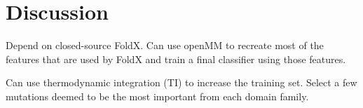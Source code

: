 \documentclass[11pt]{article}
\begin{document}
\section{Discussion}

Depend on closed-source FoldX. Can use openMM to recreate most of the features that are used by FoldX and train a final classifier using those features.

Can use thermodynamic integration (TI) to increase the training set. Select a few mutations deemed to be the most important from each domain family. 




\printbibliography[title={References}] %
\end{document}

